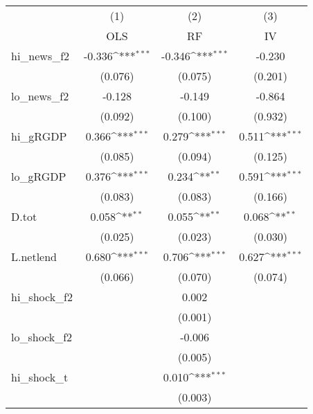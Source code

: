 {
\def\sym#1{\ifmmode^{#1}\else\(^{#1}\)\fi}
\begin{tabular}{l*{3}{c}}
\toprule
            &\multicolumn{1}{c}{(1)}&\multicolumn{1}{c}{(2)}&\multicolumn{1}{c}{(3)}\\
            &\multicolumn{1}{c}{OLS}&\multicolumn{1}{c}{RF}&\multicolumn{1}{c}{IV}\\
\midrule
hi\_news\_f2  &      -0.336\sym{***}&      -0.346\sym{***}&      -0.230         \\
            &     (0.076)         &     (0.075)         &     (0.201)         \\
\addlinespace
lo\_news\_f2  &      -0.128         &      -0.149         &      -0.864         \\
            &     (0.092)         &     (0.100)         &     (0.932)         \\
\addlinespace
hi\_gRGDP    &       0.366\sym{***}&       0.279\sym{***}&       0.511\sym{***}\\
            &     (0.085)         &     (0.094)         &     (0.125)         \\
\addlinespace
lo\_gRGDP    &       0.376\sym{***}&       0.234\sym{**} &       0.591\sym{***}\\
            &     (0.083)         &     (0.083)         &     (0.166)         \\
\addlinespace
D.tot       &       0.058\sym{**} &       0.055\sym{**} &       0.068\sym{**} \\
            &     (0.025)         &     (0.023)         &     (0.030)         \\
\addlinespace
L.netlend   &       0.680\sym{***}&       0.706\sym{***}&       0.627\sym{***}\\
            &     (0.066)         &     (0.070)         &     (0.074)         \\
\addlinespace
hi\_shock\_f2 &                     &       0.002         &                     \\
            &                     &     (0.001)         &                     \\
\addlinespace
lo\_shock\_f2 &                     &      -0.006         &                     \\
            &                     &     (0.005)         &                     \\
\addlinespace
hi\_shock\_t  &                     &       0.010\sym{***}&                     \\
            &                     &     (0.003)         &                     \\

\end{tabular}}
